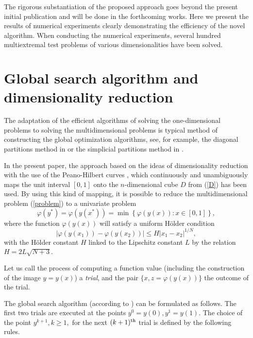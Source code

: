\documentclass[runningheads]{llncs}
\begin{document}
The rigorous substantiation of the proposed approach goes beyond the present initial publication and will be done in the forthcoming works. Here we present the results of numerical experiments clearly demonstrating the efficiency of the novel algorithm. When conducting the numerical experiments, several hundred multiextremal test problems of various dimensionalities have been solved.

\section{Global search algorithm and dimensionality reduction}

The adaptation of the efficient algorithms of solving the one-dimensional problems to solving the multidimensional problems is typical method of constructing the global optimization algorithms, see, for example, the diagonal partitions method in \cite{Sergeyev2006} or the simplicial partitions method in \cite{Zilinskas2008}.

In the present paper, the approach based on the ideas of dimensionality reduction with the use of the Peano-Hilbert curves \cite{Sergeyev2013,Strongin2000}, which continuously and unambiguously maps the unit interval $[0,1]$ onto the $n$-dimensional cube $D$ from (\ref{D}) has been used. By using this kind of mapping, it is possible to reduce the multidimensional problem (\ref{problem}) to a univariate problem
\[
\varphi(y^\ast)=\varphi(y(x^\ast))=\min{\left\{\varphi(y(x)): x\in[0,1]\right\}},
\]
where the function $\varphi(y(x))$ will satisfy a uniform H{\"o}lder condition
\[
\left|\varphi(y(x_1))-\varphi(y(x_2))\right|\leq H\left|x_1-x_2\right|^{1/N},
\]
with the H{\"o}lder constant $H$ linked to the Lipschitz constant $L$ by the relation
$ H=2 L \sqrt{N+3}$.

Let us call the process of computing a function value (including the construction of the image $y=y(x)$) a \textit{trial}, and the pair $\{x, z = \varphi(y(x))\}$ the outcome of the trial.

The global search algorithm (according to \cite{Strongin2000}) can be formulated as follows.
The first two trials are executed at 
the points $y^0=y(0), y^1=y(1)$. The choice of the point $y^{k+1},k\geq 1,$  
for the next $(k+1)^{\rm th}$ trial is defined by the following rules.
\end{document}
